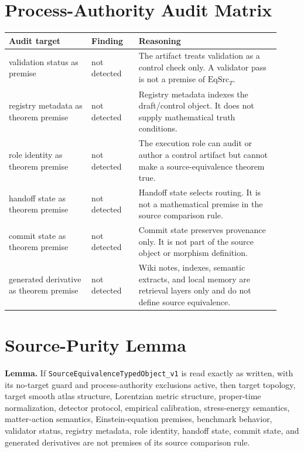 \documentclass[11pt]{article}
\newcommand{\EqSrc}{\mathrm{EqSrc}}
\begin{document}
\section*{Process-Authority Audit Matrix}

\begin{longtable}{>{\raggedright\arraybackslash}p{0.28\linewidth} >{\raggedright\arraybackslash}p{0.16\linewidth} >{\raggedright\arraybackslash}p{0.48\linewidth}}
\textbf{Audit target} & \textbf{Finding} & \textbf{Reasoning} \\
\hline
validation status as premise & not detected & The artifact treats validation as a control check only. A validator pass is not a premise of \(\EqSrc_T\). \\
registry metadata as theorem premise & not detected & Registry metadata indexes the draft/control object. It does not supply mathematical truth conditions. \\
role identity as theorem premise & not detected & The execution role can audit or author a control artifact but cannot make a source-equivalence theorem true. \\
handoff state as theorem premise & not detected & Handoff state selects routing. It is not a mathematical premise in the source comparison rule. \\
commit state as theorem premise & not detected & Commit state preserves provenance only. It is not part of the source object or morphism definition. \\
generated derivative as theorem premise & not detected & Wiki notes, indexes, semantic extracts, and local memory are retrieval layers only and do not define source equivalence. \\
\end{longtable}

\section*{Source-Purity Lemma}

\textbf{Lemma.} If \texttt{SourceEquivalenceTypedObject\_v1} is read exactly as
written, with its no-target guard and process-authority exclusions active, then
target topology, target smooth atlas structure, Lorentzian metric structure,
proper-time normalization, detector protocol, empirical calibration,
stress-energy semantics, matter-action semantics, Einstein-equation premises,
benchmark behavior, validator status, registry metadata, role identity, handoff
state, commit state, and generated derivatives are not premises of its source
comparison rule.
\end{document}
